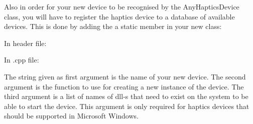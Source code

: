 Also in order for your new device to be recognised by the
AnyHapticsDevice class, you will have to register the haptics device
to a database of available devices. This is done by adding the a
static member in your new class:

In header file:



In .cpp file:



The string given as first argument is the name of your new device. The second
argument is the function to use for creating a new instance of the device. The
third argument is a list of names of dll-s that need to exist on the system to
be able to start the device. This argument is only required for haptics devices
that should be supported in Microsoft Windows.

